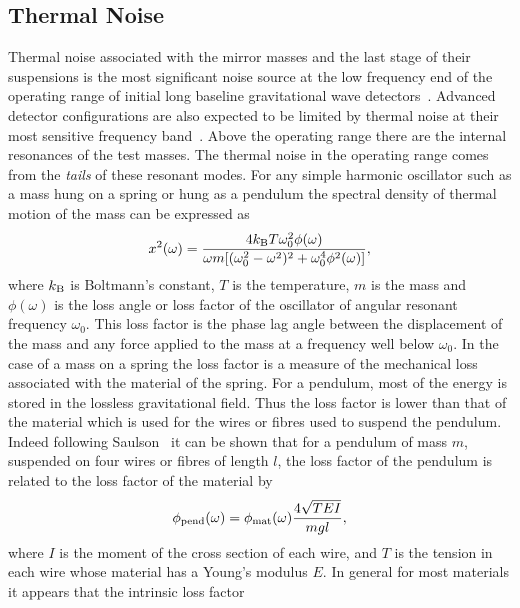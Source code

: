 \documentclass{article}
\begin{document}
\subsection{Thermal Noise}
\label{subsection:thermal}

Thermal noise associated with the mirror masses and the last stage of
their suspensions is the most significant noise source at
the low frequency end of the operating range of initial long baseline
gravitational wave detectors~\cite{Saulson2}. Advanced detector configurations
are also expected to be limited by thermal noise at their most sensitive frequency
band~\cite{Levin,Nakagawa:2002,Harry:2002,Crooks:2002}. Above the operating range
there are the internal resonances of the test masses. The
thermal noise in the operating range comes from the {\em tails} of
these resonant modes. For any simple harmonic oscillator such as a
mass hung on a spring or hung as a pendulum the spectral density of
thermal motion of the mass can be expressed as~\cite{Saulson2}
%
\begin{equation}
  x^{2}(\omega) = \frac{4 k_{\rm B} T \omega_{0}^{2}
  \phi(\omega)}{\omega m [{(\omega_{0}^{2} - \omega^{2})^2 +
  \omega_{0}^{4} \phi^{2}(\omega)}]},
  \label{equation:thnoise}
\end{equation}
%
where $k_{\rm B}$ is Boltmann's constant, $T$ is the temperature, $m$
is the mass and  $\phi(\omega)$ is the loss angle or loss factor of the
oscillator of angular resonant frequency $\omega_0$.
This loss factor is the phase lag angle between the displacement of the
mass and any force applied to the mass at a frequency well below $\omega_0$.
In the case of a mass on a spring the loss factor is a measure of the
mechanical loss associated with the material of the spring. For a
pendulum, most of the energy is stored in the lossless gravitational
field. Thus the loss factor is lower than that of the material which
is used for the wires or fibres used to suspend the pendulum. Indeed
following Saulson~\cite{Saulson2} it can be shown that for a pendulum
of mass $m$, suspended on four wires or fibres of length $l$, the loss
factor of the pendulum is related to the loss factor of the material
by
%
\begin{equation}
  \phi_{\rm pend}(\omega) = \phi_{\rm mat}(\omega)\frac{4
  \sqrt{TEI}}{mgl},
  \label{equation:pend}
\end{equation}
%
where $I$ is the moment of the cross section of  each wire, and $T$ is
the tension in each wire whose material has a Young's modulus $E$. In
general for most materials it appears that the intrinsic loss factor
\end{document}

